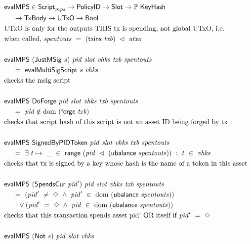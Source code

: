 \begin{figure*}[htb]
  \begin{align*}
    & \fun{evalMPS} \in\ScriptMPS\to\PolicyID\to\Slot\to\powerset\KeyHash \\
    &~~~~\to\TxBody\to\UTxO \to\Bool  \\
    & \text{UTxO is only for the outputs THIS tx is spending, not global UTxO, i.e.} \\
    & \text{when called,}~\var{spentouts}~=~(\fun{txins}~\var{txb}) ~\restrictdom~\var{utxo} \\~\\
    & \fun{evalMPS}  ~(\type{JustMSig}~s)~\var{pid}~\var{slot}~\var{vhks}
     ~\var{txb}~\var{spentouts} \\
    &~~~~ =~ \fun{evalMultiSigScript}~s~\var{vhks} \\
    & \text {checks the msig script}\\~\\
    & \fun{evalMPS}
     ~\type{DoForge}~\var{pid}~ \var{slot}~\var{vhks} ~\var{txb}~\var{spentouts} \\
    &~~~~ =~ \var{pid} \notin \dom~(\fun{forge}~\var{txb}) \\
    & \text {checks that script hash of this script is not an asset ID being forged by tx}  \\~\\
    & \fun{evalMPS}
     ~\type{SignedByPIDToken}~\var{pid}~ \var{slot}~\var{vhks} ~\var{txb}~\var{spentouts} \\
    &~~~~ =~ \exists~t\mapsto ~\_~\in~ \fun{range}~(\var{pid}~ \restrictdom~(\fun{ubalance}~\var{spentouts})) ~:~ t~\in~\var{vhks} \\
    & \text{checks that tx is signed by a key whose hash is the name of a token in this asset}
    \\~\\
    & \fun{evalMPS}
     ~(\type{SpendsCur}~\var{pid'})~\var{pid}~ \var{slot}~\var{vhks} ~\var{txb}~\var{spentouts} \\
    &~~~~ =~ (\var{pid'}~\neq~\Nothing ~\wedge ~\var{pid'}~\in~ \dom~(\fun{ubalance}~\var{spentouts}))\\
    &~~~~~~ \vee (\var{pid'}~=~\Nothing ~\wedge ~\var{pid}~\in~ \dom~(\fun{ubalance}~\var{spentouts})) \\
    & \text{checks that this transaction spends asset pid' OR itself if}~\var{pid'}~=~\Nothing
    \\~\\
    &\fun{evalMPS}~(\type{Not}~s)~\var{pid}~\var{slot}~\var{vhks}

\end{align*}
\end{figure*}
